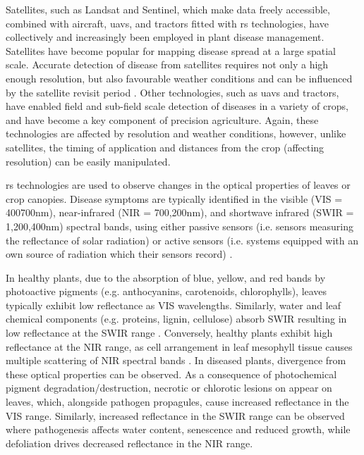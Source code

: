 Satellites, such as Landsat and Sentinel, which make data freely accessible, combined with aircraft, \acp{uav}, and tractors fitted with \ac{rs} technologies, have collectively and increasingly been employed in plant disease management. Satellites have become popular for mapping disease spread at a large spatial scale. Accurate detection of disease from satellites requires not only a high enough resolution, but also favourable weather conditions and can be influenced by the satellite revisit period \parencite{Zhang2020}. Other technologies, such as \acp{uav} and tractors, have enabled field and sub-field scale detection of diseases in a variety of crops, and have become a key component of precision agriculture. Again, these technologies are affected by resolution and weather conditions, however, unlike satellites, the timing of application and distances from the crop (affecting resolution) can be easily manipulated.  

\Ac{rs} technologies are used to observe changes in the optical properties of leaves or crop canopies. Disease symptoms are typically identified in the visible (VIS = 400\textendash700nm), near-infrared (NIR = 700,200nm), and shortwave infrared (SWIR = 1,200,400nm) spectral bands, using either passive sensors (i.e. sensors measuring the reflectance of solar radiation) or active sensors (i.e. systems equipped with an own source of radiation which their sensors record) \parencite{Mahlein2016}.  

In healthy plants, due to the absorption of blue, yellow, and red bands by photoactive pigments (e.g. anthocyanins, carotenoids, chlorophylls), leaves typically exhibit low reflectance as VIS wavelengths. Similarly, water and leaf chemical components (e.g. proteins, lignin, cellulose) absorb SWIR resulting in low reflectance at the SWIR range \parencite{West2010}. Conversely, healthy plants exhibit high reflectance at the NIR range, as cell arrangement in leaf mesophyll tissue causes multiple scattering of NIR spectral bands \parencite{Ollinger2011}. In diseased plants, divergence from these optical properties can be observed. As a consequence of photochemical pigment degradation/destruction, necrotic or chlorotic lesions on appear on leaves, which, alongside pathogen propagules, cause increased reflectance in the VIS range. Similarly, increased reflectance in the SWIR range can be observed where pathogenesis affects water content, senescence and reduced growth, while defoliation drives decreased reflectance in the NIR range.   

